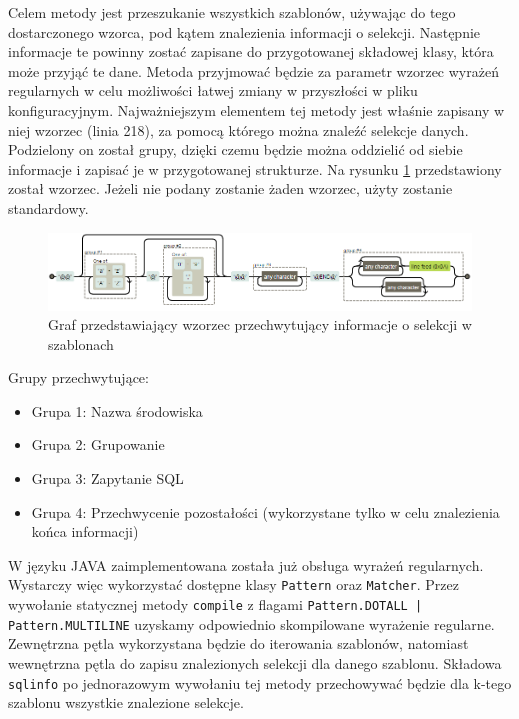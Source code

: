 Celem metody jest przeszukanie wszystkich szablonów, używając do tego dostarczonego wzorca, pod kątem znalezienia informacji o selekcji. Następnie informacje te powinny zostać zapisane do przygotowanej składowej klasy, która może przyjąć te dane. 
Metoda przyjmować będzie za parametr wzorzec wyrażeń regularnych w celu możliwości łatwej zmiany w przyszłości w pliku konfiguracyjnym. 
Najważniejszym elementem tej metody jest właśnie zapisany w niej wzorzec (linia 218), za pomocą którego można znaleźć selekcje danych. Podzielony on został grupy, dzięki czemu będzie można oddzielić od siebie informacje i zapisać je w przygotowanej strukturze. Na rysunku \ref{fig:Wzorzec} przedstawiony został wzorzec. Jeżeli nie podany zostanie żaden wzorzec, użyty zostanie standardowy. 
\begin{figure}[h]
    \centering
    \label{fig:Wzorzec}
    \includegraphics[width=1\textwidth]{rys/implementacja/regex.png}
    \caption{Graf przedstawiający wzorzec przechwytujący informacje o selekcji w szablonach}
\end{figure}
\par
Grupy przechwytujące:
\begin{itemize}
\item Grupa 1: Nazwa środowiska
\item Grupa 2: Grupowanie
\item Grupa 3: Zapytanie SQL
\item Grupa 4: Przechwycenie pozostałości (wykorzystane tylko w celu znalezienia końca informacji)
\end{itemize}
\vspace{5mm}
 \par
W języku JAVA zaimplementowana została już obsługa wyrażeń regularnych. Wystarczy więc wykorzystać dostępne klasy \texttt{Pattern} oraz \texttt{Matcher}. Przez wywołanie statycznej metody \texttt{compile} z flagami \texttt{Pattern.DOTALL | Pattern.MULTILINE} uzyskamy odpowiednio skompilowane wyrażenie regularne. Zewnętrzna pętla wykorzystana będzie do iterowania szablonów, natomiast wewnętrzna pętla do zapisu znalezionych selekcji dla danego szablonu. Składowa \texttt{sqlinfo} po jednorazowym wywołaniu tej metody przechowywać będzie dla k-tego szablonu wszystkie znalezione selekcje.

